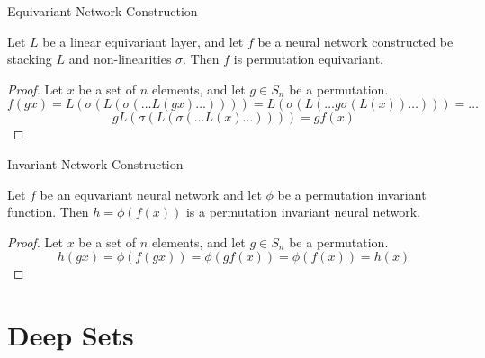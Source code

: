 \documentclass{beamer}
\begin{document}
\begin{frame}{Equivariant Network Construction}

    \begin{theorem}
        Let $L$ be a linear equivariant layer, and let $f$ be a neural network constructed be stacking $L$ and non-linearities $\sigma$. Then $f$ is permutation equivariant.
    \end{theorem}
    \begin{proof}
        Let $x$ be a set of $n$ elements, and let $g \in S_n$ be a permutation.
        \[ f(gx) = L(\sigma(L(\sigma(\ldots L(gx) \ldots)))) = L(\sigma(L( \ldots g\sigma(L(x)) \ldots))) = \ldots \]
        \[ g L(\sigma(L(\sigma(\ldots L(x) \ldots)))) = gf(x) \]
    \end{proof}
    
    
\end{frame}

\begin{frame}{Invariant Network Construction}
    \begin{theorem}
        Let $f$ be an equvariant neural network and let $\phi$ be a permutation invariant function. Then $h = \phi(f(x))$ is a permutation invariant neural network.
    \end{theorem}
    \begin{proof}
        Let $x$ be a set of $n$ elements, and let $g \in S_n$ be a permutation.
        \[ h(gx) = \phi(f(gx)) = \phi(gf(x)) = \phi(f(x)) = h(x) \]
    \end{proof}
\end{frame}


\section{Deep Sets}
\end{document}
